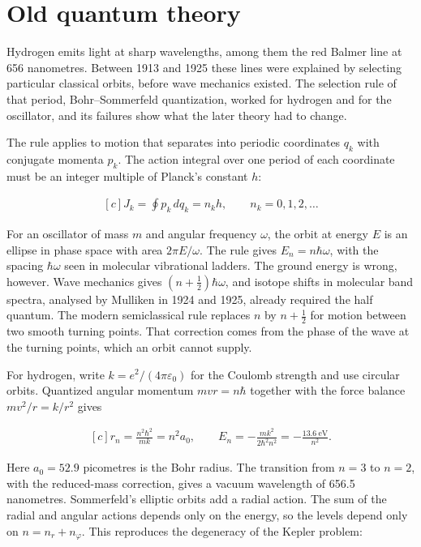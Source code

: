 \documentclass[11pt,oneside]{book}
\newenvironment{centeredalign}{\[\begin{gathered}[c]}{\end{gathered}\]}
\begin{document}
\section{Old quantum theory}

\label{topic:old-quantum-theory}

Hydrogen emits light at sharp wavelengths, among them the red Balmer line at 656 nanometres. Between 1913 and 1925 these lines were explained by selecting particular classical orbits, before wave mechanics existed. The selection rule of that period, Bohr--Sommerfeld quantization, worked for hydrogen and for the oscillator, and its failures show what the later theory had to change.

The rule applies to motion that separates into periodic coordinates \(q_k\) with conjugate momenta \(p_k\). The action integral over one period of each coordinate must be an integer multiple of Planck's constant \(h\):

\begin{centeredalign}
J_k=\oint p_k\,dq_k=n_k h,\qquad n_k=0,1,2,\ldots
\end{centeredalign}

For an oscillator of mass \(m\) and angular frequency \(\omega\), the orbit at energy \(E\) is an ellipse in phase space with area \(2\pi E/\omega\). The rule gives \(E_n=n\hbar\omega\), with the spacing \(\hbar\omega\) seen in molecular vibrational ladders. The ground energy is wrong, however. Wave mechanics gives \((n+\tfrac12)\hbar\omega\), and isotope shifts in molecular band spectra, analysed by Mulliken in 1924 and 1925, already required the half quantum. The modern semiclassical rule replaces \(n\) by \(n+\tfrac12\) for motion between two smooth turning points. That correction comes from the phase of the wave at the turning points, which an orbit cannot supply.

For hydrogen, write \(k=e^2/(4\pi\varepsilon_0)\) for the Coulomb strength and use circular orbits. Quantized angular momentum \(mvr=n\hbar\) together with the force balance \(mv^2/r=k/r^2\) gives

\begin{centeredalign}
r_n=\frac{n^2\hbar^2}{mk}=n^2a_0,\qquad
E_n=-\frac{mk^2}{2\hbar^2n^2}=-\frac{13.6\ \text{eV}}{n^2}.
\end{centeredalign}

Here \(a_0=52.9\) picometres is the Bohr radius. The transition from \(n=3\) to \(n=2\), with the reduced-mass correction, gives a vacuum wavelength of 656.5 nanometres. Sommerfeld's elliptic orbits add a radial action. The sum of the radial and angular actions depends only on the energy, so the levels depend only on \(n=n_r+n_\varphi\). This reproduces the degeneracy of the Kepler problem:
\end{document}
